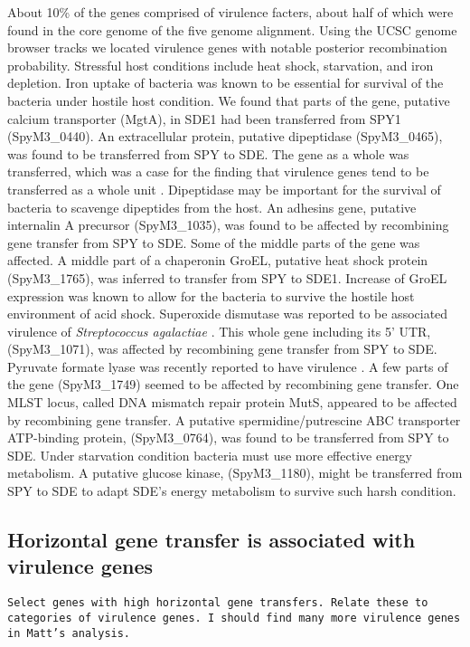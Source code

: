 \documentclass[english]{article}
\begin{document}
About 10\% of the genes comprised of virulence facters, about half of which were
found in the core genome of the five genome alignment. Using the UCSC genome
browser tracks we located virulence genes with notable posterior recombination
probability.  Stressful host conditions include heat shock, starvation, and iron
depletion.  Iron uptake of bacteria was known to be essential for survival of
the bacteria under hostile host condition. We found that parts of the gene,
putative calcium transporter (MgtA), in SDE1 had been transferred from SPY1
(SpyM3\_0440).  An extracellular protein, putative dipeptidase (SpyM3\_0465),
was found to be transferred from SPY to SDE. The gene as a whole was
transferred, which was a case for the finding that virulence genes tend to be
transferred as a whole unit \citep{Chan2009}. Dipeptidase may be important for
the survival of bacteria to scavenge dipeptides from the host.  An adhesins
gene, putative internalin A precursor (SpyM3\_1035), was found to be affected by
recombining gene transfer from SPY to SDE. Some of the middle parts of the gene
was affected.  A middle part of a chaperonin GroEL, putative heat shock protein
(SpyM3\_1765), was inferred to transfer from SPY to SDE1.  Increase of GroEL
expression was known to allow for the bacteria to survive the hostile host
environment of acid shock.  Superoxide dismutase was reported to be associated
virulence of \textit{Streptococcus agalactiae} \citep{Poyart2001}. This whole
gene including its 5' UTR, (SpyM3\_1071), was affected by recombining gene
transfer from SPY to SDE.  Pyruvate formate lyase was recently reported to have
virulence \citep{Yesilkaya2009}. A few parts of the gene (SpyM3\_1749) seemed to
be affected by recombining gene transfer.  One MLST locus, called DNA mismatch
repair protein MutS, appeared to be affected by recombining gene transfer.  A
putative spermidine/putrescine ABC transporter ATP-binding protein,
(SpyM3\_0764), was found to be transferred from SPY to SDE.  Under starvation
condition bacteria must use more effective energy metabolism.  A putative
glucose kinase, (SpyM3\_1180), might be transferred from SPY to SDE to adapt
SDE's energy metabolism to survive such harsh condition.  

\subsection{Horizontal gene transfer is associated with virulence genes}
\texttt{Select genes with high horizontal gene transfers. Relate these to
categories of virulence genes. I should find many more virulence genes in Matt's
analysis.}
\end{document}
